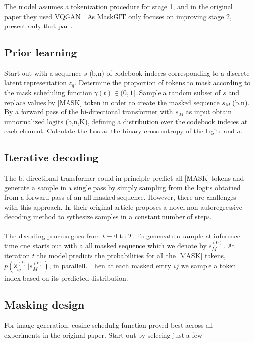 \documentclass[../../thesis.tex]{subfiles}
\begin{document}

The model assumes a tokenization procedure for stage 1, and in the original paper they used VQGAN \cite{VQGAN}. As MaskGIT only focuses on improving stage 2, present only that part. 

\subsection{Prior learning}

Start out with a sequence $s$ (b,n) of codebook indeces corresponding to a discrete latent representation $z_q$. Determine the proportion of tokens to mask according to the mask scheduling function $\gamma(t)\in (0,1]$. 
Sample a random subset of $s$ and replace values by [MASK] token in order to create the masked sequence $s_M$ (b,n). By a forward pass of the bi-directional transformer with $s_M$ as input obtain unnormalized logits (b,n,K), defining a distribution over the codebook indeces at each element. Calculate the loss as the binary cross-entropy of the logits and $s$. 

\subsection{Iterative decoding}

The bi-directional transformer could in principle predict all [MASK] tokens and generate a sample in a single pass by simply sampling from the logits obtained from a forward pass of an all masked sequence. However, there are challenges with this approach. In their original article  \cite{chang2022maskgit} proposes a novel non-autoregressive decoding method to sythesize samples in a constant number of steps.\\\\

The decoding process goes from $t = 0$ to $T$. To genereate a sample at inference time one starts out with a all masked sequence which we denote by $s_M^{(0)}$. At iteration $t$ the model predicts the probabilities for all the [MASK] tokens, $p(\hat{s}_{ij}^{(t)}|s_M^{(t)})$, in parallell. Then at each masked entry $ij$ we sample a token index based on its predicted distribution.  

\subsection{Masking design}

For image generation, cosine schedulig function proved best across all experiments in the original paper. Start out by selecing just a few 
\end{document}
